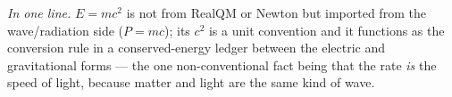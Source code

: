 \documentclass[11pt]{article}
\begin{document}
\medskip\noindent\emph{In one line.} $E=mc^2$ is not from RealQM or Newton but imported from the
wave/radiation side ($P=mc$); its $c^2$ is a unit convention and it functions as the conversion rule in a
conserved-energy ledger between the electric and gravitational forms --- the one non-conventional fact being
that the rate \emph{is} the speed of light, because matter and light are the same kind of wave.
\end{document}
